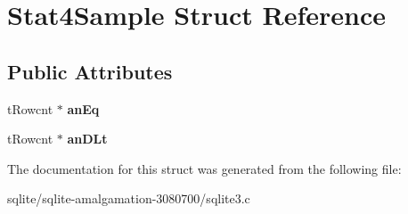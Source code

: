 \hypertarget{struct_stat4_sample}{\section{Stat4\+Sample Struct Reference}
\label{struct_stat4_sample}
}
\subsection*{Public Attributes}
\begin{DoxyCompactItemize}
\item 
\hypertarget{struct_stat4_sample_a8dd17556ec12614fbf4b88ab0bc82749}{t\+Rowcnt $\ast$ {\bfseries an\+Eq}}\label{struct_stat4_sample_a8dd17556ec12614fbf4b88ab0bc82749}

\item 
\hypertarget{struct_stat4_sample_a25519389bab21052bf80af8500388a37}{t\+Rowcnt $\ast$ {\bfseries an\+D\+Lt}}\label{struct_stat4_sample_a25519389bab21052bf80af8500388a37}

\end{DoxyCompactItemize}


The documentation for this struct was generated from the following file\+:\begin{DoxyCompactItemize}
\item 
sqlite/sqlite-\/amalgamation-\/3080700/sqlite3.\+c\end{DoxyCompactItemize}
